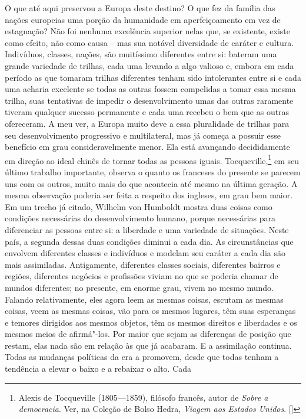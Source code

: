 O que até aqui preservou a Europa deste destino? O que fez da família das
nações europeias uma porção da humanidade em aperfeiçoamento em vez de
estagnação? Não foi nenhuma excelência superior nelas que, se existente,
existe como efeito, não como causa – mas sua notável diversidade de
caráter e cultura. Indivíduos, classes, nações, são muitíssimo diferentes
entre si: bateram uma grande variedade de trilhas, cada uma levando a algo
valioso e, embora em cada período as que tomaram trilhas diferentes tenham
sido intolerantes entre si e cada uma acharia excelente se todas as outras
fossem compelidas a tomar essa mesma trilha, suas tentativas de impedir o
desenvolvimento umas das outras raramente tiveram qualquer sucesso
permanente e cada uma recebeu o bem
que as outras ofereceram. A meu ver, a Europa muito deve a essa
pluralidade de trilhas para seu desenvolvimento progressivo e
multilateral, mas já começa a possuir esse benefício em grau
consideravelmente menor. Ela está avançando decididamente em direção ao
ideal chinês de tornar todas as pessoas iguais.  Tocqueville,\footnote{ Alexis de Tocqueville (1805---1859), filósofo francês, autor de \textit{Sobre a democracia}. Ver, na Coleção de Bolso Hedra, \textit{Viagem aos Estados Unidos}. []} em seu
último trabalho importante, observa o quanto os franceses do presente se
parecem uns com os outros, muito mais do que acontecia até mesmo na última
geração. A mesma observação poderia ser feita a respeito dos ingleses, em
grau bem maior. Em um trecho já citado, Wilhelm von Humboldt mostra duas     %
coisas como condições necessárias do desenvolvimento humano, porque 
necessárias para diferenciar as pessoas entre si: a liberdade e
uma variedade de situações. Neste país, a segunda dessas duas condições
diminui a cada dia. As circunstâncias que envolvem diferentes classes e
indivíduos e modelam seu caráter a cada dia são mais assimiladas.
Antigamente, diferentes classes sociais, diferentes bairros e regiões,
diferentes negócios e profissões viviam no que se poderia chamar de mundos
diferentes; no presente, em enorme grau, vivem no mesmo mundo. Falando
relativamente, eles agora leem as mesmas coisas, escutam as mesmas coisas,
veem as mesmas coisas, vão para os mesmos lugares, têm suas esperanças e
temores dirigidos aos mesmos objetos, têm os mesmos direitos e liberdades
e os mesmos meios de afirmá"-los. Por maior que sejam as diferenças de
posição que restam, elas nada são em relação às que já acabaram. E a
assimilação continua. Todas as mudanças políticas da era a promovem, desde
que todas tenham a tendência a elevar o baixo e a rebaixar o alto. Cada
